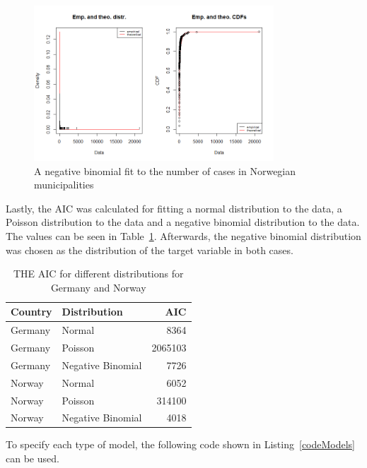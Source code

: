 %     
\begin{figure}[H]
    \centering
    \includegraphics[width = 0.8\textwidth]{neg_binom_norge.png}
    \caption{A negative binomial fit to the number of cases in Norwegian municipalities}
    \label{nb_norge}
\end{figure}
Lastly, the AIC was calculated for fitting a normal distribution to the data, a Poisson distribution to the data and a negative binomial distribution to the data. The values can be seen in Table~\ref{aic}. Afterwards, the negative binomial distribution was chosen as the distribution of the target variable in both cases. \\
\begin{table}[H] 
\caption{THE AIC for different distributions for Germany and Norway \label{aic}}
\begin{tabular}{l l r}
\toprule
\textbf{Country}	& \textbf{Distribution}	& \textbf{AIC} \\
\midrule
Germany & Normal & 8364 \\
Germany & Poisson & 2065103 \\
Germany & Negative Binomial & 7726 \\
Norway & Normal & 6052 \\
Norway & Poisson & 314100 \\
Norway & Negative Binomial & 4018 \\
\bottomrule
\end{tabular}
\end{table} 
To specify each type of model, the following code shown in Listing~\ref{codeModels} can be used. \\
